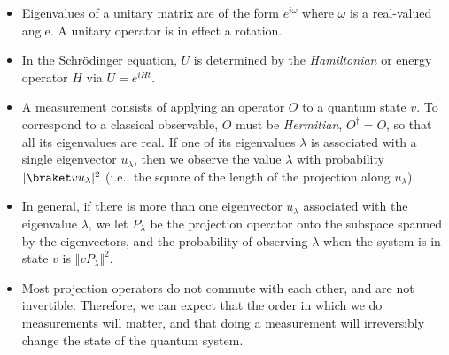\documentclass{slides}
\begin{document}
\begin{slide}{}

\begin{itemize}
	\item Eigenvalues of a unitary matrix are of the form $ e ^ {i\omega} $ where $\omega$ is a
		real-valued angle.  A unitary operator is in effect a rotation.
	\item In the Schr\"odinger equation, $U$ is determined by the {\em Hamiltonian} or
		energy operator $H$ via $U = e^{iHt}$.
	\item A measurement consists of applying an operator $O$ to a quantum state $v$.  To
		correspond to a classical observable, $O$ must be {\em Hermitian}, $O^\dag = O$, so
		that all its eigenvalues are real.  If one of its eigenvalues $\lambda$ is associated with
		a single eigenvector $u_\lambda$, then we observe the value $\lambda$ with probability
		$\vert \braket v {u_\lambda} \vert ^ 2$ (i.e., the square of the length of
		the projection along $u_\lambda$).
\end{itemize}
\end{slide}	
		
\begin{slide}{}

\begin{itemize}
	\item In general, if there is more than one eigenvector $u_\lambda$ associated with the
		eigenvalue $\lambda$, we let $P_\lambda$ be the projection operator onto the subspace
		spanned by the eigenvectors, and the probability of observing $\lambda$ when the
		system is in state $v$ is $\Vert v P_\lambda \Vert ^ 2 $.
		
	\item Most projection operators do not commute with each other, and are not invertible.
	  	Therefore, we can expect that the order in which we do measurements will matter, and that
	   	doing a measurement will irreversibly change the state of the quantum system.

\end{itemize}

\end{slide}
\end{document}

